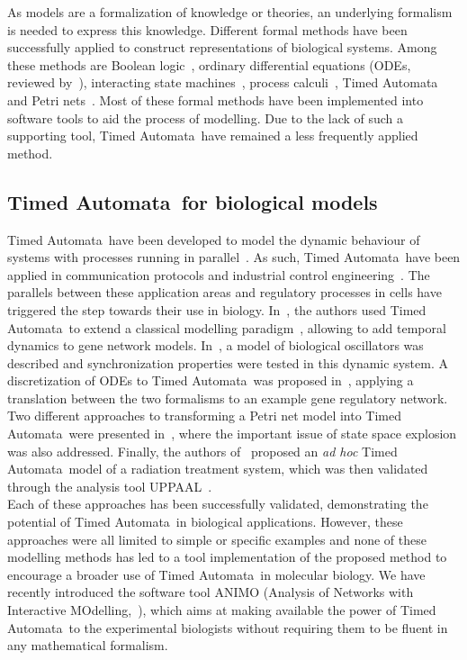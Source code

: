 \documentclass{bmcart}
\def\tas{Timed Automata}
\begin{document}
As models are a formalization of knowledge or theories, an underlying formalism is needed to express
this knowledge. Different formal methods have been successfully applied to construct representations
of biological systems. Among these methods are Boolean logic~\cite{boolean-networks-flower,boolean-networks2},
ordinary differential equations (ODEs, reviewed by~\cite{hidde-review}),
interacting state machines~\cite{interacting-sm1,interacting-sm2},
process calculi~\cite{blenx,bio-pepa}, Timed Automata~\cite{ta-siebert,bartocci-oscillators,
oded-ode-ta-discretization} and Petri nets~\cite{petri-nets,petri-nets2}.
Most of these formal methods have been implemented into software tools to aid the process
of modelling. Due to the lack of such a supporting tool, \tas\ have remained a less 
frequently applied method.

\subsection*{\tas\ for biological models}
\tas\ have been developed to model the dynamic behaviour of systems with processes running in parallel~\cite{timed-automata-alur-dill}. 
As such, \tas\ have been applied in communication protocols and industrial control engineering~\cite{ta-audio-protocol,ta-wap-gateway,ta-ws-bap}. The 
parallels between these application areas and regulatory processes in cells have triggered the step towards 
their use in biology.
In~\cite{ta-siebert}, the authors used \tas\ to extend a classical modelling paradigm~\cite{thomas-formalism},
allowing to add temporal dynamics to gene network models.
In~\cite{bartocci-oscillators}, a model of biological oscillators was described and synchronization properties
were tested in this dynamic system.
A discretization of ODEs to \tas\ was proposed in~\cite{oded-ode-ta-discretization}, applying
a translation between the two formalisms to an example gene regulatory network. Two 
different approaches to transforming
a Petri net model into \tas\ were presented in~\cite{ta-giapponesi},
where the important issue of state space explosion was also addressed.
Finally, the authors of~\cite{ta-radiazioni} proposed an \emph{ad hoc} \tas\ model of a radiation treatment
system, which was then validated through the analysis tool UPPAAL~\cite{uppaal}.\\
Each of these approaches has been successfully validated, demonstrating the potential of \tas\
in biological applications. However, these approaches were all limited to simple
or specific examples and none of these modelling methods
has led to a tool implementation of the proposed method to encourage a broader use
of \tas\ in molecular biology. We have recently introduced the software tool ANIMO
(Analysis of Networks with Interactive MOdelling,~\cite{animo-ieee}), which aims
at making available the power of \tas\ to the experimental biologists without requiring
them to be fluent in any mathematical formalism.
\end{document}
